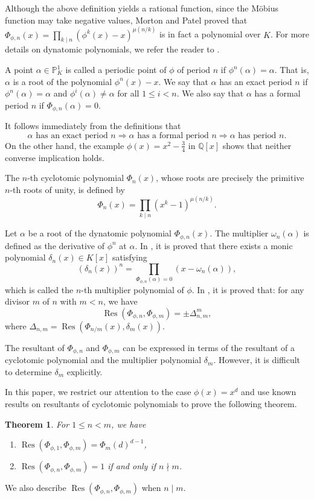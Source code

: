 \documentclass[10pt,leqno]{amsart}
\newtheorem*{theorem*}{Theorem}
\theoremstyle{definition}
\theoremstyle{remark}
\numberwithin{equation}{section}
\def\qq{\mathbb{Q}}
\def\pp{\mathbb{P}}
\newcommand{\res}{\operatorname{Res}}
\begin{document}
Although the above definition yields a rational function, since the Möbius function may take negative values, Morton and Patel \cite[Theorem 2.5]{Morton94} proved that $\Phi_{\phi,n}(x) = \prod_{k\mid n}(\phi^k(x)-x)^{\mu(n/k)}$ is in fact a polynomial over $K$. For more details on dynatomic polynomials, we refer the reader to \cite[Section 4.1]{Silverman07}.

A point $\alpha\in\pp^1_K$ is called a periodic point of $\phi$ of period $n$ if $\phi^n(\alpha) = \alpha$. That is, $\alpha$ is a root of the polynomial $\phi^n(x)-x$. We say that $\alpha$ has an exact period $n$ if $\phi^n(\alpha) = \alpha$ and $\phi^i(\alpha)\neq \alpha$ for all $1\leq i< n$. We also say that $\alpha$ has a formal period $n$ if $\Phi_{\phi,n}(\alpha) = 0$.

It follows immediately from the definitions that
$$\alpha\text{ has an exact period }n \Rightarrow \alpha\text{ has a formal period }n \Rightarrow \alpha\text{ has period }n.$$
On the other hand, the example $\phi(x) = x^2-\frac{3}{4}$ in $\qq[x]$ shows that neither converse implication holds.

The $n$-th cyclotomic polynomial $\Phi_n(x)$, whose roots are precisely the primitive $n$-th roots of unity, is defined by
$$\Phi_n(x) = \prod_{k\mid n}(x^k-1)^{\mu(n/k)}.$$

Let $\alpha$ be a root of the dynatomic polynomial $\Phi_{\phi,n}(x)$. The multiplier $\omega_n(\alpha)$ is defined as the derivative of $\phi^n$ at $\alpha$. In \cite{Vivaldi92}, it is proved that there exists a monic polynomial $\delta_n(x)\in K[x]$ satisfying
$$(\delta_n(x))^n = \prod_{\Phi_{\phi,n}(\alpha) = 0}(x-\omega_n(\alpha)),$$
which is called the $n$-th multiplier polynomial of $\phi$. In \cite{Morton95}, it is proved that:
for any divisor $m$ of $n$ with $m<n$, we have
$$\res(\Phi_{\phi,n},\Phi_{\phi,m}) = \pm\Delta_{n,m}^m,$$
where $\Delta_{n,m} = \res(\Phi_{n/m}(x),\delta_m(x))$.

The resultant of $\Phi_{\phi,n}$ and $\Phi_{\phi,m}$ can be expressed in terms of the resultant of a cyclotomic polynomial and the multiplier polynomial $\delta_m$. However, it is difficult to determine $\delta_m$ explicitly. 

In this paper, we restrict our attention to the case $\phi(x) = x^d$ and use known results on resultants of cyclotomic polynomials to prove the following theorem.
\begin{theorem*}
    For $1\leq n<m$, we have 
    \begin{enumerate}
        \item $\res(\Phi_{\phi,1},\Phi_{\phi,m}) = \Phi_m(d)^{d-1}$,
        \item $\res(\Phi_{\phi,n},\Phi_{\phi,m}) = 1$ if and only if $n\nmid m$.
    \end{enumerate}
\end{theorem*}
We also describe $\res(\Phi_{\phi,n},\Phi_{\phi,m})$ when $n\mid m$. 
\end{document}
